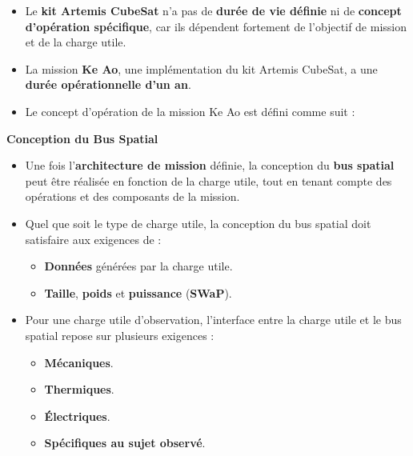 \begin{itemize}
    \item Le \textbf{kit Artemis CubeSat} n'a pas de \textbf{durée de vie définie} ni de \textbf{concept d’opération spécifique}, car ils dépendent fortement de l’objectif de mission et de la charge utile.  
    \item La mission \textbf{Ke Ao}, une implémentation du kit Artemis CubeSat, a une \textbf{durée opérationnelle d’un an}.  
    \item Le concept d’opération de la mission Ke Ao est défini comme suit :
\end{itemize}

\textbf{Conception du Bus Spatial}

\begin{itemize}
    \item Une fois l’\textbf{architecture de mission} définie, la conception du \textbf{bus spatial} peut être réalisée en fonction de la charge utile, tout en tenant compte des opérations et des composants de la mission.  
    \item Quel que soit le type de charge utile, la conception du bus spatial doit satisfaire aux exigences de :
    \begin{itemize}
        \item \textbf{Données} générées par la charge utile.  
        \item \textbf{Taille}, \textbf{poids} et \textbf{puissance} (\textbf{SWaP}).  
    \end{itemize}
    \item Pour une charge utile d’observation, l’interface entre la charge utile et le bus spatial repose sur plusieurs exigences :
    \begin{itemize}
        \item \textbf{Mécaniques}.  
        \item \textbf{Thermiques}.  
        \item \textbf{Électriques}.  
        \item \textbf{Spécifiques au sujet observé}.  
    \end{itemize}
\end{itemize}
